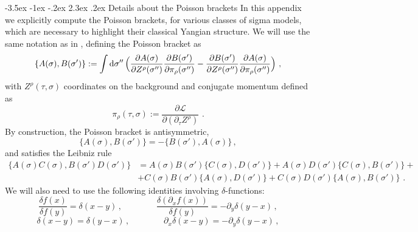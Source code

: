 \documentclass[12pt]{article}
\makeatletter
\renewcommand\section{\@startsection {section}{1}{\z@}%
                                   {-3.5ex \@plus -1ex \@minus -.2ex}%
                                   {2.3ex \@plus.2ex}%
                                   {\normalfont\large\bfseries}}
\numberwithin{equation}{section}
\makeatother
\begin{document}
\section{Details about the Poisson brackets}\label{appendix:C}
In this appendix we explicitly compute the Poisson brackets, for various classes of sigma models, which are necessary to highlight their classical Yangian structure. We will use the same notation as in \cite{Bielli:2024ach}, defining the Poisson bracket as
\begin{equation}\label{def-PB}
\{ A(\sigma),B(\sigma') \} := \int\mathrm{d}\sigma'' \, \Bigl( \frac{\partial A(\sigma)}{\partial Z^{\rho}(\sigma'')} \frac{\partial B(\sigma')}{\partial \pi_{\rho}(\sigma'')} - \frac{\partial B(\sigma')}{\partial Z^{\rho}(\sigma'')} \frac{\partial A(\sigma)}{\partial \pi_{\rho}(\sigma'')}\Bigr) \,\, ,
\end{equation}
with $Z^{\rho}(\tau,\sigma)$ coordinates on the background and conjugate momentum defined as
\begin{equation}\label{def-canonical-momentum}
\pi_{\rho}(\tau,\sigma):=\frac{\partial \mathcal{L}}{\partial (\partial_{\tau}Z^{\rho})} \,\, .
\end{equation}
By construction, the Poisson bracket is antisymmetric,
\begin{equation}\label{def-PB-antisymmetry}
\{ A(\sigma),B(\sigma') \} = - \{ B(\sigma'),A(\sigma) \} \, ,
\end{equation}
and satisfies the Leibniz rule
\begin{equation}\label{def-PB-Leibniz}
\begin{aligned}
\{ A(\sigma)C(\sigma),B(\sigma')D(\sigma') \}&=A(\sigma)B(\sigma') \{ C(\sigma),D(\sigma') \} + A(\sigma)D(\sigma') \{ C(\sigma),B(\sigma') \}+
\\
& +C(\sigma)B(\sigma') \{ A(\sigma),D(\sigma') \}+C(\sigma)D(\sigma') \{ A(\sigma),B(\sigma') \} \,\, .
\end{aligned}
\end{equation}
We will also need to use the following identities involving $\delta$-functions:
\begin{equation}\label{def-delta-func-identity-1}
\frac{\delta f(x)}{\delta f(y)}=\delta(x-y) \, ,
\qquad \qquad
\frac{\delta(\partial_{x}f(x))}{\delta f(y)}=-\partial_{y}\delta(y-x) \, ,
\end{equation}
\begin{equation}\label{def-delta-func-identity-2}
\delta(x-y)=\delta(y-x) \, ,\qquad \qquad
\partial_{x}\delta(x-y)=-\partial_{y}\delta(y-x) \, ,
\end{equation}
\end{document}
